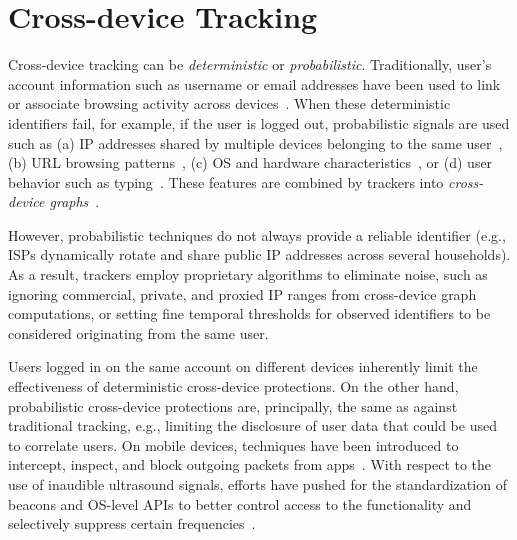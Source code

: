 \section{Cross-device Tracking}
\label{sec:cross-device}

 Cross-device tracking can be \textit{deterministic} or \textit{probabilistic}. Traditionally, user’s account information such as username or email addresses have been used to link or associate browsing activity across devices~\cite{kimProbabilisticVisitorStitching2017,cottaOffPolicyEvaluationProbabilistic2019,brookmanCrossDeviceTrackingMeasurement2017}. When these deterministic identifiers fail, for example, if the user is logged out, probabilistic signals are used such as (a) IP addresses shared by multiple devices belonging to the same user~\cite{diaz-moralesCrossDeviceTrackingMatching2015}, (b) URL browsing patterns~\cite{phanCrossDeviceMatching2017}, (c) OS and hardware characteristics~\cite{caoCrossBrowserFingerprintingOS2017}, or (d) user behavior such as typing~\cite{yuanCrossdeviceTrackingIdentification2018}. These features are combined by trackers into \textit{cross-device graphs}~\cite{zimmeckPrivacyAnalysisCrossdevice2017,wangGraphTrackGraphbasedCrossDevice2022}.

 However, probabilistic techniques do not always provide a reliable identifier (e.g., ISPs dynamically rotate and share public IP addresses across several households). As a result, trackers employ proprietary algorithms to eliminate noise, such as ignoring commercial, private, and proxied IP ranges from cross-device graph computations, or setting fine temporal thresholds for observed identifiers to be considered originating from the same user.


 Users logged in on the same account on different devices inherently limit the effectiveness of deterministic cross-device protections. On the other hand, probabilistic cross-device protections are, principally, the same as against traditional tracking, e.g., limiting the disclosure of user data that could be used to correlate users. 
On mobile devices, techniques have been introduced to intercept, inspect, and block outgoing packets from apps~\cite{shubaNoMoAdsEffectiveEfficient2018}. With respect to the use of inaudible ultrasound signals, efforts have pushed for the standardization of beacons and OS-level APIs to better control access to the functionality and selectively suppress certain frequencies~\cite{mavroudisPrivacySecurityUltrasound2017}.


